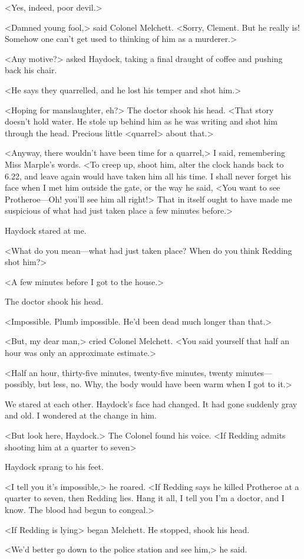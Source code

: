 <Yes, indeed, poor devil.>

<Damned young fool,> said Colonel Melchett. <Sorry, Clement. But he really is! Somehow one can't get used to thinking of him as a murderer.>

<Any motive?> asked Haydock, taking a final draught of coffee and pushing back his chair.

<He says they quarrelled, and he lost his temper and shot him.>

<Hoping for manslaughter, eh?> The doctor shook his head. <That story doesn't hold water. He stole up behind him as he was writing and shot him through the head. Precious little <quarrel> about that.>

<Anyway, there wouldn't have been time for a quarrel,> I said, remembering Miss Marple's words. <To creep up, shoot him, alter the clock hands back to 6.22, and leave again would have taken him all his time. I shall never forget his face when I met him outside the gate, or the way he said, <You want to see Protheroe—Oh! you'll see him all right!> That in itself ought to have made me suspicious of what had just taken place a few minutes before.>

Haydock stared at me.

<What do you mean—what had just taken place? When do you think Redding shot him?>

<A few minutes before I got to the house.>

The doctor shook his head.

<Impossible. Plumb impossible. He'd been dead much longer than that.>

<But, my dear man,> cried Colonel Melchett. <You said yourself that half an hour was only an approximate estimate.>

<Half an hour, thirty-five minutes, twenty-five minutes, twenty minutes—possibly, but less, no. Why, the body would have been warm when I got to it.>

We stared at each other. Haydock's face had changed. It had gone suddenly gray and old. I wondered at the change in him.

<But look here, Haydock.> The Colonel found his voice. <If Redding admits shooting him at a quarter to seven\longdash>

Haydock sprang to his feet.

<I tell you it's impossible,> he roared. <If Redding says he killed Protheroe at a quarter to seven, then Redding lies. Hang it all, I tell you I'm a doctor, and I know. The blood had begun to congeal.>

<If Redding is lying\longdash> began Melchett. He stopped, shook his head.

<We'd better go down to the police station and see him,> he said.